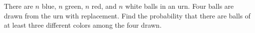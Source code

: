 \begin{problem}[Handout 2, \# 19]
  There are \(n\) blue, \(n\) green, \(n\) red, and \(n\) white balls in an
  urn. Four balls are drawn from the urn with replacement. Find the
  probability that there are balls of at least three different colors among
  the four drawn.
\end{problem}
\begin{solution}

\end{solution}

